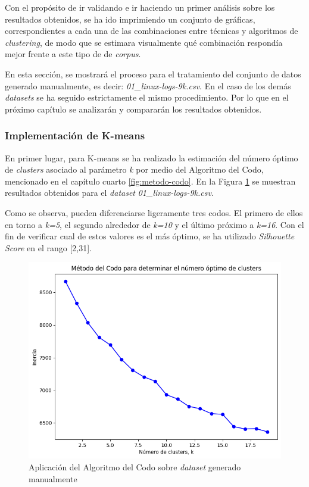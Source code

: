 Con el propósito de ir validando e ir haciendo un primer análisis sobre los resultados obtenidos, se ha ido imprimiendo un conjunto de gráficas, correspondientes a cada una de las combinaciones entre técnicas y algoritmos de \textit{clustering}, de modo que se estimara visualmente qué combinación respondía mejor frente a este tipo de de \textit{corpus}.


En esta sección, se mostrará el proceso para el tratamiento del conjunto de datos generado manualmente, es decir: \textit{01\_linux-logs-9k.csv}. En el caso de los demás \textit{datasets} se ha seguido estrictamente el mismo procedimiento. Por lo que en el próximo capítulo se analizarán y compararán los resultados obtenidos.

\subsubsection*{Implementación de K-means}

En primer lugar, para K-means se ha realizado la estimación del número óptimo de \textit{clusters} asociado al parámetro \textit{k} por medio del Algoritmo del Codo\footnotemark, mencionado en el capítulo cuarto \ref{fig:metodo-codo}. En la Figura \ref{fig:codo-manual} se muestran resultados obtenidos para el \textit{dataset} \textit{01\_linux-logs-9k.csv}.

Como se observa, pueden diferenciarse ligeramente tres codos. El primero de ellos en torno a \textit{k=5}, el segundo alrededor de \textit{k=10} y el último próximo a \textit{k=16}. Con el fin de verificar cual de estos valores es el más óptimo, se ha utilizado \textit{Silhouette Score} en el rango [2,31].

\newpage

\begin{figure}[H]
    \centering
    \includegraphics[width=0.95\linewidth]{imagenes/algoritmo-codo.png}
    \caption{Aplicación del Algoritmo del Codo sobre \textit{dataset} generado manualmente}
    \label{fig:codo-manual}
\end{figure}

